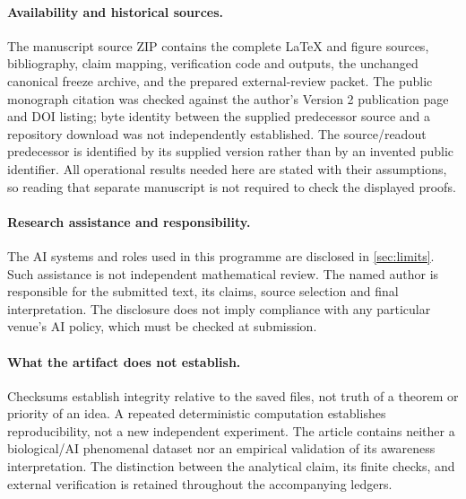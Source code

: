 \paragraph{Availability and historical sources.}
The manuscript source ZIP contains the complete LaTeX and figure sources, bibliography, claim mapping, verification code and outputs, the unchanged canonical freeze archive, and the prepared external-review packet. The public monograph citation was checked against the author's Version 2 publication page and DOI listing; byte identity between the supplied predecessor source and a repository download was not independently established. The source/readout predecessor \cite{RodgersSealed2026} is identified by its supplied version rather than by an invented public identifier. All operational results needed here are stated with their assumptions, so reading that separate manuscript is not required to check the displayed proofs.

\paragraph{Research assistance and responsibility.}
The AI systems and roles used in this programme are disclosed in \cref{sec:limits}. Such assistance is not independent mathematical review. The named author is responsible for the submitted text, its claims, source selection and final interpretation. The disclosure does not imply compliance with any particular venue's AI policy, which must be checked at submission.

\paragraph{What the artifact does not establish.}
Checksums establish integrity relative to the saved files, not truth of a theorem or priority of an idea. A repeated deterministic computation establishes reproducibility, not a new independent experiment. The article contains neither a biological/AI phenomenal dataset nor an empirical validation of its awareness interpretation. The distinction between the analytical claim, its finite checks, and external verification is retained throughout the accompanying ledgers.


\clearpage
\printbibliography[heading=bibintoc,title={References}]

